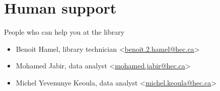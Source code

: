 \documentclass[aspectratio=1610,compress,t,gabaritb,french,english]{hecppt}
\begin{document}
\section{Human support}

	\begin{frame}[c]{People who can help you at the library}
		\begin{itemize}
			\item Benoit Hamel, library technician <\href{mailto:benoit.2.hamel@hec.ca}{benoit.2.hamel@hec.ca}>
			\item Mohamed Jabir, data analyst <\href{mailto:mohamed.jabir@hec.ca}{mohamed.jabir@hec.ca}>
			\item Michel Yevenunye Keoula, data analyst <\href{mailto:michel.keoula@hec.ca}{michel.keoula@hec.ca}>
		\end{itemize}
	\end{frame}
\end{document}
